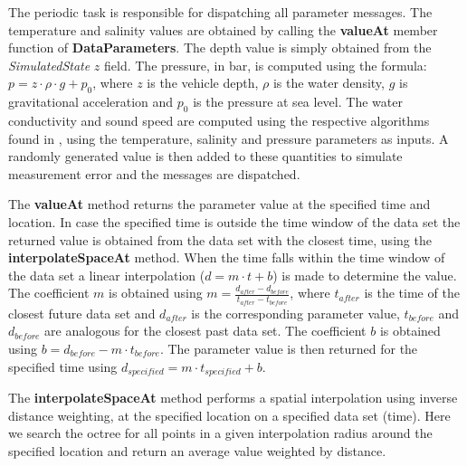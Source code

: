 \documentclass[10pt,a4paper]{article}
\begin{document}
\par The periodic task is responsible for dispatching all parameter messages. The temperature and salinity values are obtained by calling the \textbf{valueAt} member function of \textbf{DataParameters}. The depth value is simply obtained from the \textit{SimulatedState} $z$ field. The pressure, in bar, is computed using the formula: $p = z \cdot \rho \cdot g + p_0$, where $z$ is the vehicle depth, $\rho$ is the water density, $g$ is gravitational acceleration and $p_0$ is the pressure at sea level. The water conductivity and sound speed are computed using the respective algorithms found in \cite{UNESCO}, using the temperature, salinity and pressure parameters as inputs. A randomly generated value is then added to these quantities to simulate measurement error and the messages are dispatched.

\par The \textbf{valueAt} method returns the parameter value at the specified time and location. In case the specified time is outside the time window of the data set the returned value is obtained from the data set with the closest time, using the \textbf{interpolateSpaceAt} method. When the time falls within the time window of the data set a linear interpolation ($d = m \cdot t + b$) is made to determine the value. The coefficient $m$ is obtained using $m = \frac{d_{after} - d_{before}}{t_{after} - t_{before}}$, where $t_{after}$ is the time of the closest future data set and $d_{after}$ is the corresponding parameter value, $t_{before}$ and $d_{before}$ are analogous for the closest past data set. The coefficient $b$ is obtained using $b = d_{before} - m \cdot t_{before}$. The parameter value is then returned for the specified time using $d_{specified} = m \cdot t_{specified} + b$.

\par The \textbf{interpolateSpaceAt} method performs a spatial interpolation using inverse distance weighting, at the specified location on a specified data set (time). Here we search the octree for all points in a given interpolation radius around the specified location and return an average value weighted by distance.



\end{document}
